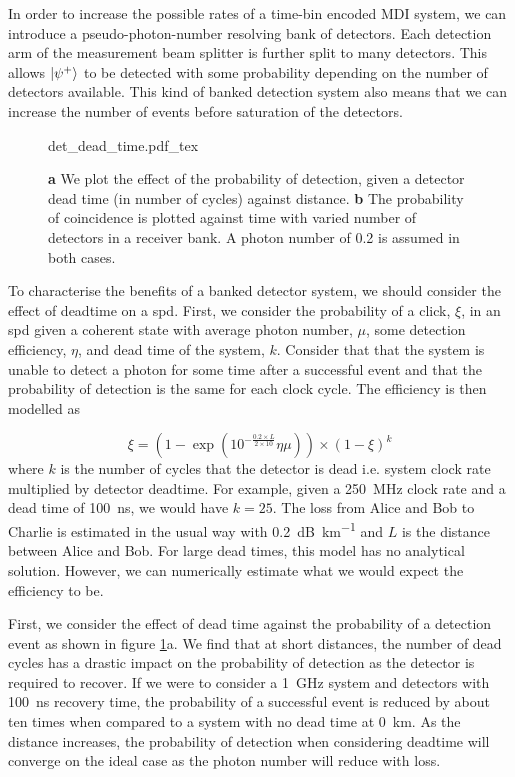 In order to increase the possible rates of a time-bin encoded \ac{MDI} system, we can introduce a pseudo-photon-number resolving bank of detectors. Each detection arm of the measurement beam splitter is further split to many detectors. This allows $\ket{\psi^+}$ to be detected with some probability depending on the number of detectors available. This kind of banked detection system also means that we can increase the number of events before saturation of the detectors. 

\begin{figure}[tbp]
	\centering
	\tiny
	\def\svgwidth{\textwidth} 
	{det_dead_time.pdf_tex}
	\caption[Effect of detector dead time and banked detectors]{\textbf{a} We plot the effect of the probability of detection, given a detector dead time (in number of cycles) against distance. \textbf{b} The probability of coincidence is plotted against time with varied number of detectors in a receiver bank. A photon number of 0.2 is assumed in both cases. }
	\label{fig:det_eff_dead_time}
\end{figure}

To characterise the benefits of a banked detector system, we should consider the effect of deadtime on a \ac{spd}. First, we consider the probability of a click, $\xi$, in an \ac{spd} given a coherent state with average photon number, $\mu$, some detection efficiency, $\eta$, and dead time of the system, $k$. Consider that that the system is unable to detect a photon for some time after a successful event and that the probability of detection is the same for each clock cycle. The efficiency is then modelled as

\begin{equation}
	\xi = ( 1 - \exp(10^{-\frac{0.2 \times L}{2 \times 10}} \eta \mu) ) \times (1 - \xi)^k
\end{equation}
where $k$ is the number of cycles that the detector is dead i.e. system clock rate multiplied by detector deadtime. For example, given a \SI{250}{\MHz} clock rate and a dead time of \SI{100}{ns}, we would have $k=25$. The loss from Alice and Bob to Charlie is estimated in the usual way with \SI{0.2}{dB\per\km} and $L$ is the distance between Alice and Bob. For large dead times, this model has no analytical solution. However, we can numerically estimate what we would expect the efficiency to be.

First, we consider the effect of dead time against the probability of a detection event as shown in figure \ref{fig:det_eff_dead_time}a. We find that at short distances, the number of dead cycles has a drastic impact on the probability of detection as the detector is required to recover. If we were to consider a \SI{1}{GHz} system and detectors with \SI{100}{ns} recovery time, the probability of a successful event is reduced by about ten times when compared to a system with no dead time at \SI{0}{\km}. As the distance increases, the probability of detection when considering deadtime will converge on the ideal case as the photon number will reduce with loss. 

